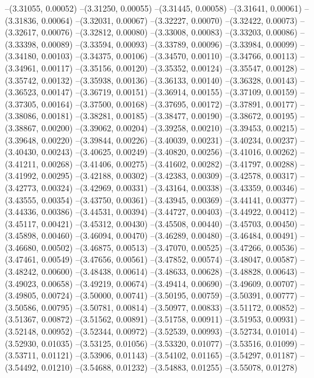 --(3.31055, 0.00052)
--(3.31250, 0.00055)
--(3.31445, 0.00058)
--(3.31641, 0.00061)
--(3.31836, 0.00064)
--(3.32031, 0.00067)
--(3.32227, 0.00070)
--(3.32422, 0.00073)
--(3.32617, 0.00076)
--(3.32812, 0.00080)
--(3.33008, 0.00083)
--(3.33203, 0.00086)
--(3.33398, 0.00089)
--(3.33594, 0.00093)
--(3.33789, 0.00096)
--(3.33984, 0.00099)
--(3.34180, 0.00103)
--(3.34375, 0.00106)
--(3.34570, 0.00110)
--(3.34766, 0.00113)
--(3.34961, 0.00117)
--(3.35156, 0.00120)
--(3.35352, 0.00124)
--(3.35547, 0.00128)
--(3.35742, 0.00132)
--(3.35938, 0.00136)
--(3.36133, 0.00140)
--(3.36328, 0.00143)
--(3.36523, 0.00147)
--(3.36719, 0.00151)
--(3.36914, 0.00155)
--(3.37109, 0.00159)
--(3.37305, 0.00164)
--(3.37500, 0.00168)
--(3.37695, 0.00172)
--(3.37891, 0.00177)
--(3.38086, 0.00181)
--(3.38281, 0.00185)
--(3.38477, 0.00190)
--(3.38672, 0.00195)
--(3.38867, 0.00200)
--(3.39062, 0.00204)
--(3.39258, 0.00210)
--(3.39453, 0.00215)
--(3.39648, 0.00220)
--(3.39844, 0.00226)
--(3.40039, 0.00231)
--(3.40234, 0.00237)
--(3.40430, 0.00243)
--(3.40625, 0.00249)
--(3.40820, 0.00256)
--(3.41016, 0.00262)
--(3.41211, 0.00268)
--(3.41406, 0.00275)
--(3.41602, 0.00282)
--(3.41797, 0.00288)
--(3.41992, 0.00295)
--(3.42188, 0.00302)
--(3.42383, 0.00309)
--(3.42578, 0.00317)
--(3.42773, 0.00324)
--(3.42969, 0.00331)
--(3.43164, 0.00338)
--(3.43359, 0.00346)
--(3.43555, 0.00354)
--(3.43750, 0.00361)
--(3.43945, 0.00369)
--(3.44141, 0.00377)
--(3.44336, 0.00386)
--(3.44531, 0.00394)
--(3.44727, 0.00403)
--(3.44922, 0.00412)
--(3.45117, 0.00421)
--(3.45312, 0.00430)
--(3.45508, 0.00440)
--(3.45703, 0.00450)
--(3.45898, 0.00460)
--(3.46094, 0.00470)
--(3.46289, 0.00480)
--(3.46484, 0.00491)
--(3.46680, 0.00502)
--(3.46875, 0.00513)
--(3.47070, 0.00525)
--(3.47266, 0.00536)
--(3.47461, 0.00549)
--(3.47656, 0.00561)
--(3.47852, 0.00574)
--(3.48047, 0.00587)
--(3.48242, 0.00600)
--(3.48438, 0.00614)
--(3.48633, 0.00628)
--(3.48828, 0.00643)
--(3.49023, 0.00658)
--(3.49219, 0.00674)
--(3.49414, 0.00690)
--(3.49609, 0.00707)
--(3.49805, 0.00724)
--(3.50000, 0.00741)
--(3.50195, 0.00759)
--(3.50391, 0.00777)
--(3.50586, 0.00795)
--(3.50781, 0.00814)
--(3.50977, 0.00833)
--(3.51172, 0.00852)
--(3.51367, 0.00872)
--(3.51562, 0.00891)
--(3.51758, 0.00911)
--(3.51953, 0.00931)
--(3.52148, 0.00952)
--(3.52344, 0.00972)
--(3.52539, 0.00993)
--(3.52734, 0.01014)
--(3.52930, 0.01035)
--(3.53125, 0.01056)
--(3.53320, 0.01077)
--(3.53516, 0.01099)
--(3.53711, 0.01121)
--(3.53906, 0.01143)
--(3.54102, 0.01165)
--(3.54297, 0.01187)
--(3.54492, 0.01210)
--(3.54688, 0.01232)
--(3.54883, 0.01255)
--(3.55078, 0.01278)

